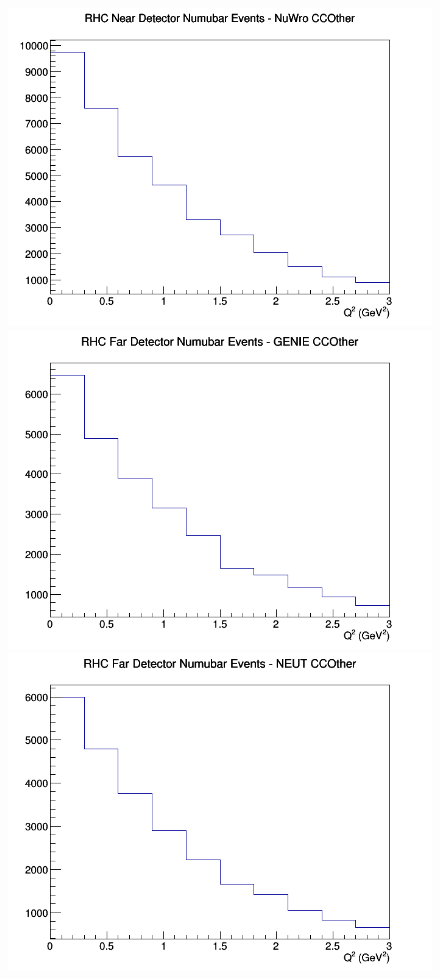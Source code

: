 \begin{figure}[h]
\includegraphics[width=\linewidth]{eff_Q2/LAr/CCOther_RHC_ND_numubar_Q2_NuWro.png}
\endminipage
\newline
{}
\includegraphics[width=\linewidth]{eff_Q2/LAr/CCOther_RHC_FD_numubar_Q2_GENIE.png}
\endminipage
{}
\includegraphics[width=\linewidth]{eff_Q2/LAr/CCOther_RHC_FD_numubar_Q2_NEUT.png}

\end{figure}
